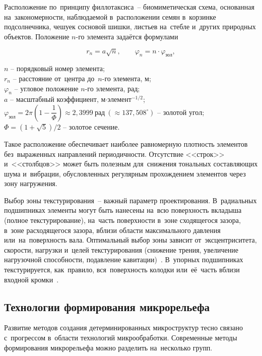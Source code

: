 Расположение по~принципу филлотаксиса~-- биомиметическая схема, основанная на~закономерности, наблюдаемой в~расположении семян в~корзинке подсолнечника, чешуек сосновой шишки, листьев на~стебле и~других природных объектов. Положение $n$-го элемента задаётся формулами

\begin{equation}
r_n = a\sqrt{n}, \qquad \varphi_n = n \cdot \varphi_{\text{зол}},
\end{equation}
\begin{conditions}
$n$ -- порядковый номер элемента;\\
$r_n$ -- расстояние от~центра до~$n$-го элемента, м;\\
$\varphi_n$ -- угловое положение $n$-го элемента, рад;\\
$a$ -- масштабный коэффициент, м$\cdot$элемент$^{-1/2}$;\\
$\varphi_{\text{зол}} = 2\pi\left(1 - \dfrac{1}{\Phi}\right) \approx 2{,}3999~\text{рад} \ (\approx 137{,}508^{\circ})$ -- золотой угол;\\
$\Phi = (1+\sqrt{5})/2$ -- золотое сечение.
\end{conditions}
Такое расположение обеспечивает наиболее равномерную плотность элементов без~выраженных направлений периодичности. Отсутствие <<строк>> и~<<столбцов>> может быть полезным для~снижения тональных составляющих шума и~вибрации, обусловленных регулярным прохождением элементов через зону нагружения.

Выбор зоны текстурирования~-- важный параметр проектирования. В~радиальных подшипниках элементы могут быть нанесены на~всю поверхность вкладыша (полное текстурирование), на~часть поверхности в~зоне сходящегося зазора, в~зоне расходящегося зазора, вблизи области максимального давления или~на~поверхность вала. Оптимальный выбор зоны зависит от~эксцентриситета, скорости, нагрузки и~целей текстурирования (снижение трения, увеличение нагрузочной способности, подавление кавитации)~\cite{yazhou2024,profito2024}. В~упорных подшипниках текстурируется, как~правило, вся~поверхность колодки или~её~часть вблизи входной кромки~\cite{gropper2018}.

\subsection{Технологии формирования микрорельефа}

Развитие методов создания детерминированных микроструктур тесно связано с~прогрессом в~области технологий микрообработки. Современные методы формирования микрорельефа можно разделить на~несколько групп.

